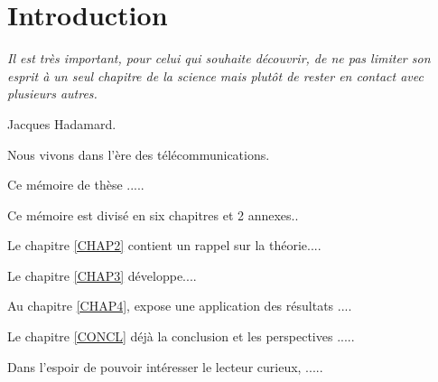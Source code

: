 \chapter{Introduction} \label{INTRO}
\smallskip
\hfill
\begin{minipage}[b]{8cm}
{\it Il est tr\`es important, pour celui qui souhaite d\'ecouvrir, de ne pas limiter son esprit \`a un seul chapitre de la
science mais plut\^ot de rester en contact avec plusieurs autres.}
\end{minipage}
\begin{flushright} Jacques Hadamard. \end{flushright}
\vskip 2cm

{\Huge N}ous vivons dans l'\`ere des t\'el\'ecommunications.
\medskip

Ce m\'emoire de th\`ese .....
\bigskip

Ce m\'emoire est divis\'e en six chapitres et 2 annexes.. \medskip


Le chapitre \ref{CHAP2} contient un rappel sur la th\'eorie....  \medskip

Le chapitre \ref{CHAP3} d\'eveloppe....  \medskip

Au chapitre \ref{CHAP4}, expose une application des résultats ....  \medskip

Le chapitre \ref{CONCL}  d\'ej\`a la conclusion et les perspectives .....\medskip

Dans l'espoir de pouvoir int\'eresser le lecteur curieux, .....


